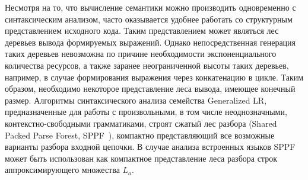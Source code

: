 Несмотря на то, что вычисление семантики можно производить одновременно с синтаксическим анализом, часто оказывается удобнее работать со структурным представлением исходного кода. Таким представлением может являться лес деревьев вывода формируемых выражений. Однако непосредственная генерация таких деревьев невозможна по причине необходимости экспоненциального количества ресурсов, а также заранее неограниченной высоты таких деревьев, например, в случае формирования выражения через конкатенацию в цикле. Таким образом, необходимо некоторое  представление леса вывода, имеющее конечный размер. Алгоритмы синтаксического анализа семейства Generalized LR, предназначенные для работы с произвольными, в том числе неоднозначными, контекстно-свободными грамматиками, строят сжатый лес разбора (Shared Packed Parse Forest, SPPF~\cite{SPPF}), компактно представляющий все возможные варианты разбора входной цепочки. В случае анализа встроенных языков SPPF может быть использован как компактное представление леса разбора строк аппроксимирующего множества $L_{a}$. \newpage